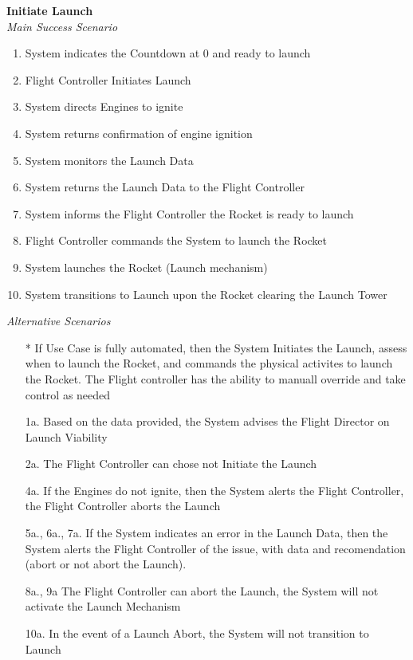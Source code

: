 \documentclass[letterpaper]{article}
\begin{document}
\noindent
\textbf{Initiate Launch}\\
\textit{Main Success Scenario}
\begin{enumerate}
\item System indicates the Countdown at 0 and ready to launch
\item Flight Controller Initiates Launch
\item System directs Engines to ignite
\item System returns confirmation of engine ignition
\item System monitors the Launch Data
\item System returns the Launch Data to the Flight Controller
\item System informs the Flight Controller the Rocket is ready to
launch
\item Flight Controller commands the System to launch the Rocket
\item System launches the Rocket (Launch mechanism)
\item System transitions to Launch upon the Rocket clearing the Launch
Tower
\end{enumerate}
\textit{Alternative Scenarios}
\begin{itemize}
\item[*] If Use Case is fully automated,
then the System Initiates the Launch, assess when to launch the
Rocket, and commands the physical activites to launch the Rocket.  The
Flight controller has the ability to manuall override and take control
as needed
\item[1a.]  Based on the data provided, the System advises the Flight
Director on Launch Viability
\item[2a.]  The Flight Controller can chose not Initiate the Launch
\item[4a.]  If the Engines do not ignite, then the System alerts the
Flight Controller, the Flight Controller aborts the Launch
\item [5a., 6a., 7a.]  If the System indicates an error in the Launch
Data,
then the System alerts the Flight Controller of the issue, with data
and recomendation (abort or not abort
the Launch).
\item[8a., 9a]  The Flight Controller can abort the Launch, the System
will not activate the Launch Mechanism
\item[10a.]  In the event of a Launch Abort, the System will not
transition to Launch
\end{itemize}
\end{document}
